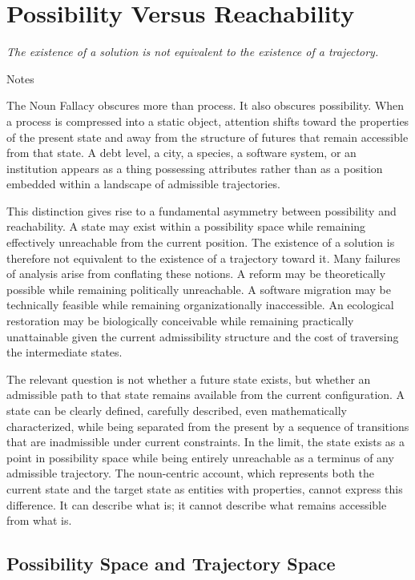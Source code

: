 \documentclass[12pt, a4paper]{article}
\theoremstyle{plain}
\theoremstyle{definition}
\theoremstyle{remark}
\begin{document}
\section{Possibility Versus Reachability}
\label{sec:possibility}

\epigraph{\textit{The existence of a solution is not equivalent to the
existence of a trajectory.}}{Notes}

\noindent
The Noun Fallacy obscures more than process. It also obscures possibility.
When a process is compressed into a static object, attention shifts toward
the properties of the present state and away from the structure of futures
that remain accessible from that state. A debt level, a city, a species,
a software system, or an institution appears as a thing possessing attributes
rather than as a position embedded within a landscape of admissible
trajectories.

This distinction gives rise to a fundamental asymmetry between possibility
and reachability. A state may exist within a possibility space while remaining
effectively unreachable from the current position. The existence of a solution
is therefore not equivalent to the existence of a trajectory toward it. Many
failures of analysis arise from conflating these notions. A reform may be
theoretically possible while remaining politically unreachable. A software
migration may be technically feasible while remaining organizationally
inaccessible. An ecological restoration may be biologically conceivable while
remaining practically unattainable given the current admissibility structure
and the cost of traversing the intermediate states.

The relevant question is not whether a future state exists, but whether an
admissible path to that state remains available from the current configuration.
A state can be clearly defined, carefully described, even mathematically
characterized, while being separated from the present by a sequence of
transitions that are inadmissible under current constraints. In the limit,
the state exists as a point in possibility space while being entirely
unreachable as a terminus of any admissible trajectory. The noun-centric
account, which represents both the current state and the target state as
entities with properties, cannot express this difference. It can describe
what is; it cannot describe what remains accessible from what is.

\subsection{Possibility Space and Trajectory Space}
\end{document}
